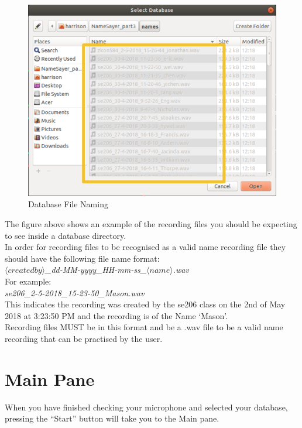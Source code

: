 \documentclass[a4paper,12pt]{article}
\begin{document}
\begin{figure}[!h]
	\includegraphics[width=\linewidth]{dbnames.png}
	\caption{Database File Naming}
\end{figure}

The figure above shows an example of the recording files you should be expecting to see inside a database directory. 
\\


In order for recording files to be recognised as a valid name recording file they should have the following file name format:
\\


\textit{$\langle created by\rangle$\_dd-MM-yyyy\_HH-mm-ss\_$\langle name\rangle$.wav}
\\


For example:
\\


\textit{se206\_2-5-2018\_15-23-50\_Mason.wav}
\\


This indicates the recording was created by the se206 class on the 2nd of May 2018 at 3:23:50 PM and the recording is of the Name ‘Mason’.
\\


Recording files MUST be in this format and be a .wav file to be a valid name recording that can be practised by the user.
\newpage
\section{Main Pane}
When you have finished checking your microphone and selected your database, pressing the “Start” button will take you to the Main pane.
\end{document}
